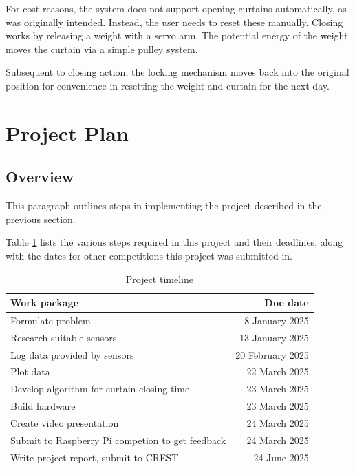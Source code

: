\documentclass[a4paper,12pt]{article}
\begin{document}
For cost reasons, the system does not support opening curtains automatically, as was originally intended. Instead, the user needs to reset these manually.
Closing works by releasing a weight with a servo arm. The potential energy of the weight moves the curtain via a simple pulley system.

Subsequent to closing action, the locking mechanism moves back into the original position for convenience in resetting the weight and curtain 
for the next day.

\section{Project Plan}

\subsection{Overview}

This paragraph outlines steps in implementing the project described in the previous section.

Table \ref{tab:projtimeline} lists the various steps required in this project and their deadlines, along with the dates for other competitions this project was submitted in.

\begin{table}[h!]
    \caption{Project timeline}
    \begin{tabular}{l | r}
        Work package & Due date \\
        \hline
        Formulate problem &  8 January 2025 \\
        Research suitable sensors & 13 January 2025 \\
        Log data provided by sensors & 20 February 2025 \\
        Plot data & 22 March 2025 \\
        Develop algorithm for curtain closing time & 23 March 2025 \\
        Build hardware & 23 March 2025 \\
        Create video presentation & 24 March 2025 \\
        Submit to Raspberry Pi competion to get feedback & 24 March 2025 \\
        Write project report, submit to CREST &  24 June 2025\\
    \end{tabular}
    \label{tab:projtimeline}
\end{table}
\end{document}
